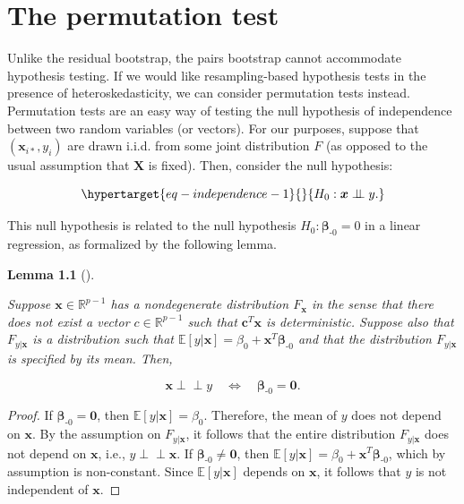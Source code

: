 \documentclass[
  11pt,
  letterpaper,
  oneside]{book}
\theoremstyle{definition}
\theoremstyle{plain}
\theoremstyle{plain}
\theoremstyle{plain}
\newtheorem{lemma}{Lemma}[chapter]
\theoremstyle{remark}
\begin{document}
\hypertarget{sec-permutation-test}{%
\chapter{The permutation test}\label{sec-permutation-test}}

Unlike the residual bootstrap, the pairs bootstrap cannot accommodate
hypothesis testing. If we would like resampling-based hypothesis tests
in the presence of heteroskedasticity, we can consider permutation tests
instead. Permutation tests are an easy way of testing the null
hypothesis of independence between two random variables (or vectors).
For our purposes, suppose that \((\boldsymbol{x}_{i*}, y_i)\) are drawn
i.i.d. from some joint distribution \(F\) (as opposed to the usual
assumption that \(\boldsymbol{X}\) is fixed). Then, consider the null
hypothesis:

\begin{equation}\protect\hypertarget{eq-independence-1}{}{
H_0: \boldsymbol{x} \perp\!\!\!\perp y.
}\label{eq-independence-1}\end{equation}

This null hypothesis is related to the null hypothesis
\(H_0: \boldsymbol{\beta}_{\text{-}0} = 0\) in a linear regression, as
formalized by the following lemma.

\begin{lemma}[]\protect\hypertarget{lem-independence}{}\label{lem-independence}

Suppose \(\boldsymbol{x} \in \mathbb{R}^{p-1}\) has a nondegenerate
distribution \(F_{\boldsymbol{x}}\) in the sense that there does not
exist a vector \(c \in \mathbb{R}^{p-1}\) such that
\(\boldsymbol{c}^T \boldsymbol{x}\) is deterministic. Suppose also that
\(F_{y|\boldsymbol{x}}\) is a distribution such that
\(\mathbb{E}[y|\boldsymbol{x}] = \beta_0 + \boldsymbol{x}^T \boldsymbol{\beta}_{\text{-}0}\)
and that the distribution \(F_{y|\boldsymbol{x}}\) is specified by its
mean. Then,

\[
\boldsymbol{x} \perp\!\!\!\perp y \quad \Longleftrightarrow \quad \boldsymbol{\beta}_{\text{-}0} = \boldsymbol{0}.
\]

\end{lemma}

\begin{proof}

If \(\boldsymbol{\beta}_{\text{-}0} = \boldsymbol{0}\), then
\(\mathbb{E}[y|\boldsymbol{x}] = \beta_0\). Therefore, the mean of \(y\)
does not depend on \(\boldsymbol{x}\). By the assumption on
\(F_{y|\boldsymbol{x}}\), it follows that the entire distribution
\(F_{y|\boldsymbol{x}}\) does not depend on \(\boldsymbol{x}\), i.e.,
\(y \perp\!\!\!\perp \boldsymbol{x}\). If
\(\boldsymbol{\beta}_{\text{-}0} \neq \boldsymbol{0}\), then
\(\mathbb{E}[y|\boldsymbol{x}] = \beta_0 + \boldsymbol{x}^T \boldsymbol{\beta}_{\text{-}0}\),
which by assumption is non-constant. Since
\(\mathbb{E}[y|\boldsymbol{x}]\) depends on \(\boldsymbol{x}\), it
follows that \(y\) is not independent of \(\boldsymbol{x}\).

\end{proof}
\end{document}
